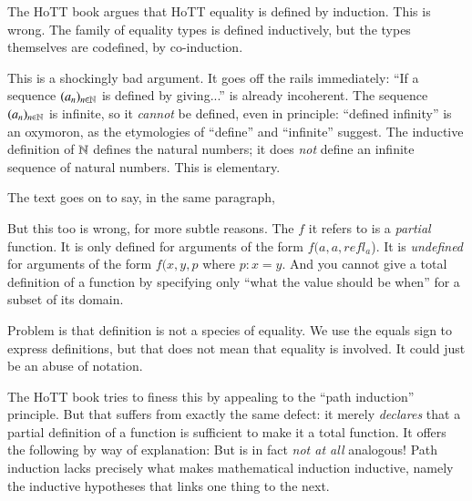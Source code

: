 \documentclass{article}
\begin{document}
The HoTT book argues that HoTT equality is defined by induction. This
is wrong. The family of equality types is defined inductively, but the
types themselves are codefined, by co-induction.


This is a shockingly bad argument. It goes off the rails immediately:
\enquote{If a sequence \((a_n)_{n\in\mathbb{N}}\) is defined by giving...}
is already incoherent. The sequence \((a_n)_{n\in\mathbb{N}}\) is infinite,
so it \textit{cannot} be defined, even in principle: ``defined
infinity'' is an oxymoron, as the etymologies of ``define'' and
``infinite'' suggest. The inductive definition of \(\mathbb{N}\) defines the
natural numbers; it does \textit{not} define an infinite sequence of
natural numbers. This is elementary.

The text goes on to say, in the same paragraph, 

But this too is wrong, for more subtle reasons. The \(f\) it refers to
is a \textit{partial} function. It is only defined for arguments of
the form \(f(a,a,refl_a\)). It is \textit{undefined} for arguments of
the form \(f(x,y,p\) where \(p:x=y\). And you cannot give a total
definition of a function by specifying only ``what the value should be
when'' for a subset of its domain.

Problem is that definition is not a species of equality. We use the
equals sign to express definitions, but that does not mean that
equality is involved. It could just be an abuse of notation.

The HoTT book tries to finess this by appealing to the ``path
induction'' principle. But that suffers from exactly the same defect:
it merely \textit{declares} that a partial definition of a function is
sufficient to make it a total function. It offers the following by way
of explanation:  But is in fact \textit{not at all} analogous!
Path induction lacks precisely what makes mathematical induction
inductive, namely the inductive hypotheses that links one thing to the
next.
\end{document}
